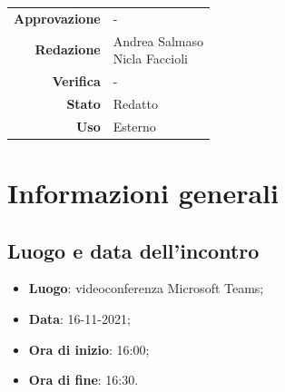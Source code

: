 \documentclass[11pt]{article}
\begin{document}
\begin{titlepage}
\begin{center}
			\large
			
			
			\vfill
			
			\begin{tabular}{r|l}
				\textbf{Approvazione} &  -\\
				\textbf{Redazione} &  \parbox[t]{3.5cm}{Andrea Salmaso \\Nicla Faccioli}\\
				\textbf{Verifica} &  -\\
				\textbf{Stato} & Redatto \\
				\textbf{Uso} & Esterno
			\end{tabular}
			\vfill
			
		\end{center}
	\end{titlepage}

	\newpage

	\section{Informazioni generali}
	\subsection{Luogo e data dell'incontro}
	\begin{itemize}
		\item \textbf{Luogo}: videoconferenza Microsoft Teams;
		\item \textbf{Data}: 16-11-2021;
		\item \textbf{Ora di inizio}: 16:00;
		\item \textbf{Ora di fine}: 16:30.
	\end{itemize}
	
\end{document}
